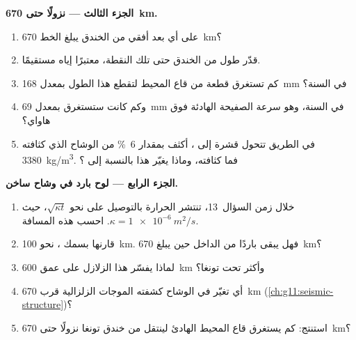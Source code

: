 \begin{problem}
\medskip
\noindent\textbf{الجزء الثالث --- نزولًا حتى \qty{670}{km}.}
\begin{enumerate}[resume]
  \item على أي بعد أفقي من الخندق يبلغ الخط
        \qty{670}{km}؟
  \item قدّر طول  من الخندق حتى تلك النقطة،
        معتبرًا إياه مستقيمًا.
  \item كم تستغرق قطعة من قاع المحيط لتقطع هذا الطول بمعدل
        \qty{168}{mm} في السنة؟
  \item وكم كانت ستستغرق بمعدل \qty{69}{mm} في السنة، وهو سرعة الصفيحة
        الهادئة فوق هاواي؟
  \item في الطريق تتحول قشرة  إلى ،
        أكثف بمقدار \qty{6}{\percent} من الوشاح الذي كثافته \qty{3380}{kg/m^3}. فما
        كثافته، وماذا يغيّر هذا بالنسبة إلى ؟
\end{enumerate}

\medskip
\noindent\textbf{الجزء الرابع --- لوح بارد في وشاح ساخن.}
\begin{enumerate}[resume]
  \item خلال زمن السؤال~13، تنتشر الحرارة بالتوصيل على نحو
        $\sqrt{\kappa t}$، حيث $\kappa = \qty{1e-6}{m^2/s}$. احسب هذه
        المسافة.
  \item قارنها بسمك ، نحو \qty{100}{km}. فهل
        يبقى  باردًا من الداخل حين يبلغ \qty{670}{km}؟
  \item لماذا يفسّر هذا الزلازل على عمق \qty{600}{km} وأكثر
        تحت تونغا؟
  \item أي تغيّر في الوشاح كشفته الموجات الزلزالية قرب
        \qty{670}{km} (\cref{ch:g11:seismic-structure})؟
  \item استنتج: كم يستغرق قاع المحيط الهادئ لينتقل من خندق
        تونغا نزولًا حتى \qty{670}{km}؟
\end{enumerate}
\end{problem}
